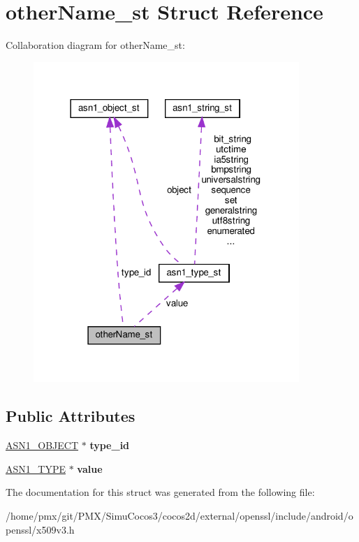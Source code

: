 \hypertarget{structotherName__st}{}\section{other\+Name\+\_\+st Struct Reference}
\label{structotherName__st}


Collaboration diagram for other\+Name\+\_\+st\+:
\nopagebreak
\begin{figure}[H]
\begin{center}
\leavevmode
\includegraphics[width=285pt]{structotherName__st__coll__graph}
\end{center}
\end{figure}
\subsection*{Public Attributes}
\begin{DoxyCompactItemize}
\item 
\mbox{\label{structotherName__st_a37f709934e2e34a6cf556f5113438f88}} 
\hyperlink{structasn1__object__st}{A\+S\+N1\+\_\+\+O\+B\+J\+E\+CT} $\ast$ {\bfseries type\+\_\+id}
\item 
\mbox{\label{structotherName__st_a1e7083606ed3944b0ccab409f92dd85a}} 
\hyperlink{structasn1__type__st}{A\+S\+N1\+\_\+\+T\+Y\+PE} $\ast$ {\bfseries value}
\end{DoxyCompactItemize}


The documentation for this struct was generated from the following file\+:\begin{DoxyCompactItemize}
\item 
/home/pmx/git/\+P\+M\+X/\+Simu\+Cocos3/cocos2d/external/openssl/include/android/openssl/x509v3.\+h\end{DoxyCompactItemize}
